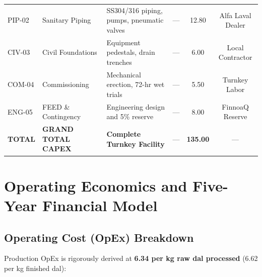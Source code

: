 \documentclass[10pt,a4paper]{article}
\newcommand{\inr}{\text{INR~}}
\begin{document}
\begin{table}[H]
\begin{tabularx}{\linewidth}{lp{3.0cm}Xccc}
PIP-02 & Sanitary Piping & SS304/316 piping, pumps, pneumatic valves & --- & 12.80 & Alfa Laval Dealer \\
CIV-03 & Civil Foundations & Equipment pedestals, drain trenches & --- & 6.00 & Local Contractor \\
COM-04 & Commissioning & Mechanical erection, 72-hr wet trials & --- & 5.50 & Turnkey Labor \\
ENG-05 & FEED \& Contingency & Engineering design and 5\% reserve & --- & 8.00 & FinnoaQ Reserve \\
\midrule
\textbf{TOTAL} & \textbf{GRAND TOTAL CAPEX} & \textbf{Complete Turnkey Facility} & --- & \textbf{135.00} & --- \\
\bottomrule
\end{tabularx}
\end{table}

\section{Operating Economics and Five-Year Financial Model}

\subsection{Operating Cost (OpEx) Breakdown}
Production OpEx is rigorously derived at \textbf{\inr 6.34 per kg raw dal processed} (\inr 6.62 per kg finished dal):
\end{document}
